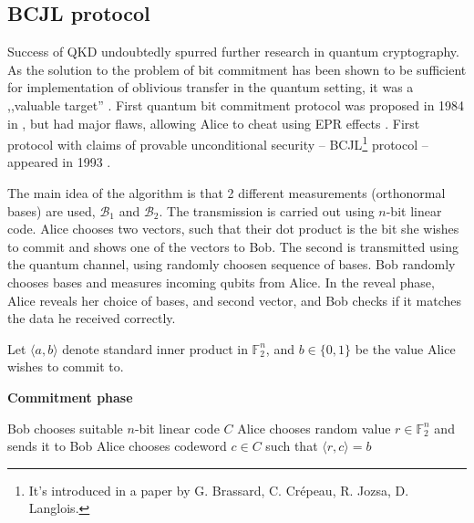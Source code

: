 \documentclass[10pt]{article}
\begin{document}
\subsection{BCJL protocol}

Success of QKD undoubtedly spurred further research in quantum cryptography. As the solution to the 
problem of bit commitment has been shown to be sufficient for implementation of oblivious transfer
in the quantum setting, it was a ,,valuable target'' \cite{Crepeau88,Bennet92}. First quantum bit
commitment protocol was proposed in 1984 in \cite{bb84}\footnotemark, but had major flaws, allowing
Alice to cheat using EPR effects \cite{bcjl93}. First protocol with claims of provable unconditional
security -- BCJL\footnote{It's introduced in a paper by G. Brassard, C. Cr\'{e}peau, R. Jozsa, 
D. Langlois.} protocol -- appeared in 1993 \cite{bcjl93}.


The main idea of the algorithm is that 2 different measurements (orthonormal bases) are used, 
\(\mathcal{B}_1\) and \(\mathcal{B}_2\). The transmission is carried out using \(n\)-bit linear
code. Alice chooses two vectors, such that their dot product is the bit she wishes to commit and
shows one of the vectors to Bob. The second is transmitted using the quantum channel, using randomly
choosen sequence of bases. Bob randomly chooses bases and measures incoming qubits from Alice. In the
reveal phase, Alice reveals her choice of bases, and second vector, and Bob checks if it matches
the data he received correctly.


Let \(\langle a,b\rangle\) denote standard inner product in \(\mathbb{F}_2^n\), and \(b\in\{0,1\}\) 
be the value Alice wishes to commit to.


\NoCaptionOfAlgo
\begin{algorithm}[H]
\caption{\textbf{Commitment phase}}
Bob chooses suitable \(n\)-bit linear code \(C\) \;
Alice chooses random value \(r\in\mathbb{F}_2^n\) and sends it to Bob \;
Alice chooses codeword \(c\in C\) such that \(\langle r,c\rangle = b\) \;
\end{algorithm}
\end{document}
